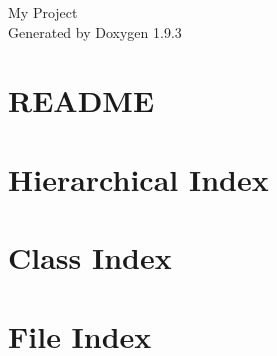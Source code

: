 \documentclass[twoside]{book}
\newcommand{\+}{\discretionary{\mbox{\scriptsize$\hookleftarrow$}}{}{}}
\newcommand{\clearemptydoublepage}{%
    \newpage{\pagestyle{empty}\cleardoublepage}%
  }
\begin{document}
  \raggedbottom
    \hypersetup{pageanchor=false,
                bookmarksnumbered=true,
                pdfencoding=unicode
               }
  \begin{titlepage}
  \vspace*{7cm}
  \begin{center}%
  {\Large My Project}\\
  \vspace*{1cm}
  {\large Generated by Doxygen 1.9.3}\\
  \end{center}
  \end{titlepage}
  \clearemptydoublepage
  \tableofcontents
  \clearemptydoublepage
  \hypersetup{pageanchor=true}
\chapter{README}
\label{md__r_e_a_d_m_e}

\chapter{Hierarchical Index}

\chapter{Class Index}

\chapter{File Index}

\end{document}
